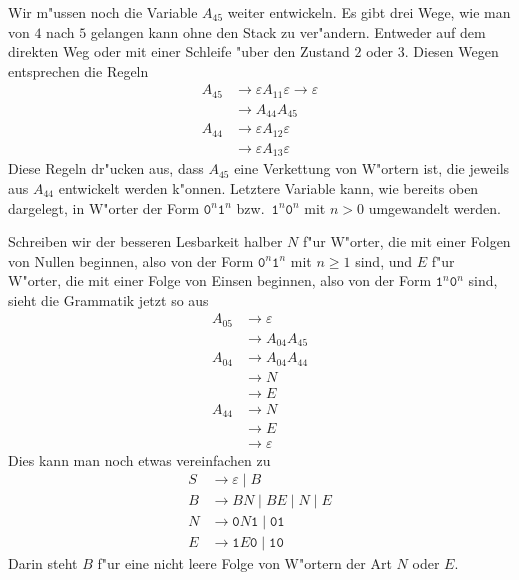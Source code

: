 \begin{loesung}
Wir m"ussen noch die Variable $A_{45}$ weiter entwickeln. Es gibt
drei Wege, wie man von $4$ nach $5$ gelangen kann ohne den
Stack zu ver"andern. Entweder auf dem direkten Weg oder mit
einer Schleife "uber den Zustand $2$ oder $3$.
Diesen Wegen entsprechen die Regeln
\begin{align*}
A_{45}&\to\varepsilon A_{11}\varepsilon\to\varepsilon\\
      &\to A_{44}A_{45}\\
A_{44}&\to\varepsilon A_{12}\varepsilon\\
      &\to\varepsilon A_{13}\varepsilon
\end{align*}
Diese Regeln dr"ucken aus, dass $A_{45}$ eine Verkettung von W"ortern
ist, die jeweils aus $A_{44}$ entwickelt werden k"onnen.
Letztere Variable kann, wie bereits oben dargelegt,
in W"orter der Form $\texttt{0}^n\texttt{1}^n$ bzw.~$\texttt{1}^n\texttt{0}^n$
mit $n>0$ umgewandelt werden.

Schreiben wir der besseren Lesbarkeit halber $N$ f"ur W"orter, die mit
einer Folgen von Nullen beginnen, also von der
Form $\texttt{0}^n\texttt{1}^n$ mit $n\ge 1$ sind, und $E$ f"ur W"orter,
die mit einer Folge von Einsen beginnen, also von der
Form $\texttt{1}^n\texttt{0}^n$ sind, sieht die Grammatik jetzt so aus
\begin{align*}
A_{05}&\to\varepsilon \\
      &\to A_{04}A_{45} \\
A_{04}&\to A_{04}A_{44} \\
      &\to N \\
      &\to E \\
A_{44}&\to N \\
      &\to E \\
      &\to \varepsilon
\end{align*}
Dies kann man noch etwas vereinfachen zu
\begin{align*}
S&\to \varepsilon\;|\; B\\
B&\to BN\;|\;BE\;|\;N\;|\;E\\
N&\to \texttt{0}N\texttt{1}\;|\; \texttt{01}\\
E&\to \texttt{1}E\texttt{0}\;|\; \texttt{10}
\end{align*}
Darin steht $B$ f"ur eine nicht leere Folge von W"ortern der Art $N$
oder $E$.
\end{loesung}


